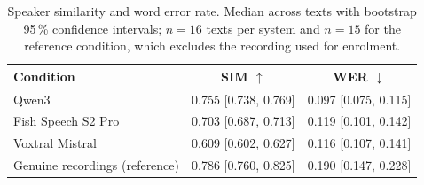 \begin{table}[H]
    \centering
    \small
    \begin{tabular}{lcc}
        \toprule
        \textbf{Condition} & \textbf{SIM} $\uparrow$ & \textbf{WER} $\downarrow$ \\
        \midrule
        Qwen3 & 0.755 [0.738, 0.769] & 0.097 [0.075, 0.115] \\
        Fish Speech S2 Pro & 0.703 [0.687, 0.713] & 0.119 [0.101, 0.142] \\
        Voxtral Mistral & 0.609 [0.602, 0.627] & 0.116 [0.107, 0.141] \\
        \midrule
        Genuine recordings (reference) & 0.786 [0.760, 0.825] & 0.190 [0.147, 0.228] \\
        \bottomrule
    \end{tabular}
    \caption{Speaker similarity and word error rate. Median across texts with bootstrap 95\,\% confidence intervals; $n = 16$ texts per system and $n = 15$ for the reference condition, which excludes the recording used for enrolment.}
    \label{tab:objective_quality}
\end{table}
